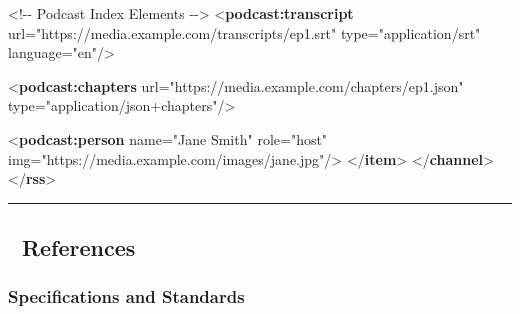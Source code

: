 \documentclass[
  letterpaper,
  DIV=11,
  numbers=noendperiod]{scrartcl}
\newenvironment{Shaded}{\begin{snugshade}}{\end{snugshade}}
\newcommand{\CommentTok}[1]{\textcolor[rgb]{0.37,0.37,0.37}{#1}}
\newcommand{\KeywordTok}[1]{\textcolor[rgb]{0.00,0.23,0.31}{\textbf{#1}}}
\newcommand{\NormalTok}[1]{\textcolor[rgb]{0.00,0.23,0.31}{#1}}
\newcommand{\OtherTok}[1]{\textcolor[rgb]{0.00,0.23,0.31}{#1}}
\newcommand{\StringTok}[1]{\textcolor[rgb]{0.13,0.47,0.30}{#1}}
\begin{document}
\begin{Shaded}
\begin{Highlighting}[]
      \CommentTok{\textless{}!{-}{-} Podcast Index Elements {-}{-}\textgreater{}}
\NormalTok{      \textless{}}\KeywordTok{podcast:transcript} 
\OtherTok{          url=}\StringTok{"https://media.example.com/transcripts/ep1.srt"} 
\OtherTok{          type=}\StringTok{"application/srt"} 
\OtherTok{        language=}\StringTok{"en"}\NormalTok{/\textgreater{}}
      
\NormalTok{      \textless{}}\KeywordTok{podcast:chapters} 
\OtherTok{     url=}\StringTok{"https://media.example.com/chapters/ep1.json"} 
\OtherTok{ type=}\StringTok{"application/json+chapters"}\NormalTok{/\textgreater{}}
      
\NormalTok{      \textless{}}\KeywordTok{podcast:person} 
\OtherTok{       name=}\StringTok{"Jane Smith"} 
\OtherTok{          role=}\StringTok{"host"} 
\OtherTok{          img=}\StringTok{"https://media.example.com/images/jane.jpg"}\NormalTok{/\textgreater{}}
\NormalTok{    \textless{}/}\KeywordTok{item}\NormalTok{\textgreater{}}
\NormalTok{  \textless{}/}\KeywordTok{channel}\NormalTok{\textgreater{}}
\NormalTok{\textless{}/}\KeywordTok{rss}\NormalTok{\textgreater{}}
\end{Highlighting}
\end{Shaded}

\begin{center}\rule{0.5\linewidth}{0.5pt}\end{center}

\subsection{📖 References}\label{references}

\subsubsection{Specifications and
Standards}\label{specifications-and-standards}
\end{document}
